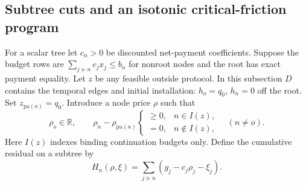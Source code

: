 \documentclass[11pt,letterpaper]{article}
\theoremstyle{definition}
\newcommand{\1}{\mathbf 1}
\begin{document}
\subsection{Subtree cuts and an isotonic critical-friction program}
For a scalar tree let $c_n>0$ be discounted net-payment coefficients. Suppose the budget rows are $\sum_{j\succeq n}c_jx_j\leq b_n$ for nonroot nodes and the root has exact payment equality. Let $z$ be any feasible outside protocol. In this subsection $D$ contains the temporal edges and initial installation: $h_o=q_0$, $h_n=0$ off the root. Set $z_{\mathrm{pa}(o)}=q_0$. Introduce a node price $\rho$ such that
\begin{equation}\label{eq:r12-isotonic}
 \rho_o\in\mathbb R,\qquad
 \rho_n-\rho_{\mathrm{pa}(n)}\begin{cases}\geq0,& n\in I(z),\\=0,& n\notin I(z),\end{cases}
 \quad(n\ne o).
\end{equation}
Here $I(z)$ indexes binding continuation budgets only. Define the cumulative residual on a subtree by
\begin{equation}\label{eq:r12-cut}
 H_n(\rho,\xi)=\sum_{j\succeq n}(g_j-c_j\rho_j-\xi_j).
\end{equation}
\end{document}
